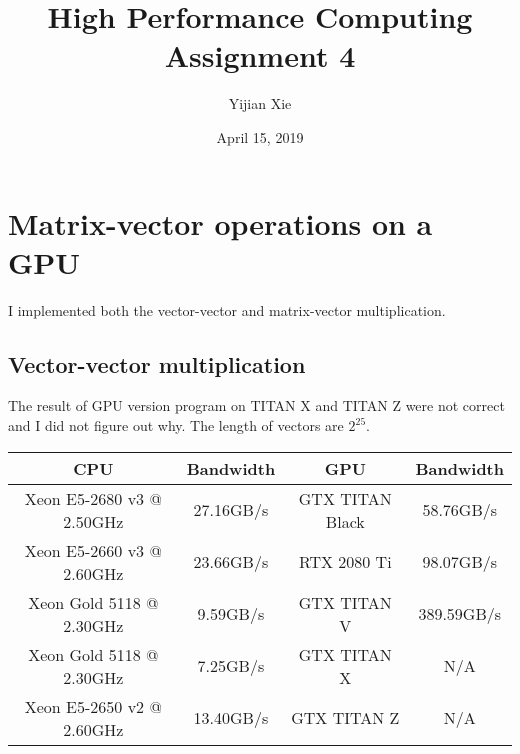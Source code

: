 \documentclass[12pt]{article}
\title{High Performance Computing Assignment 4}
\author{Yijian Xie}
\date{April 15, 2019}
\begin{document}
\maketitle

\section{Matrix-vector operations on a GPU}
    I implemented both the vector-vector and matrix-vector multiplication.\\
    \subsection*{Vector-vector multiplication}
    The result of GPU version program on TITAN X and TITAN Z were not correct and I did not figure out why. The length of vectors are $2^{25}$.
    \begin{table}[h!]
        \begin{tabular}{|c|c|c|c|}
        \hline
        CPU & Bandwidth & GPU & Bandwidth \\ \hline
        Xeon E5-2680 v3 @ 2.50GHz & 27.16GB/s & GTX TITAN Black & 58.76GB/s \\ \hline
        Xeon E5-2660 v3 @ 2.60GHz & 23.66GB/s & RTX 2080 Ti & 98.07GB/s \\ \hline
        Xeon Gold 5118 @ 2.30GHz & 9.59GB/s & GTX TITAN V & 389.59GB/s \\ \hline
        Xeon Gold 5118 @ 2.30GHz & 7.25GB/s & GTX TITAN X & N/A \\ \hline
        Xeon E5-2650 v2 @ 2.60GHz & 13.40GB/s & GTX TITAN Z & N/A \\ \hline
        \end{tabular}
    \end{table}
    
\end{document}
